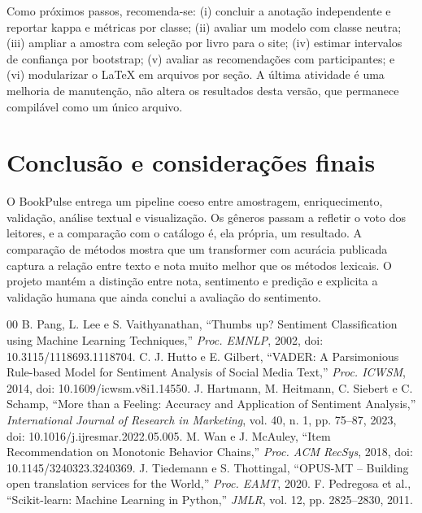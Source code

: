 \documentclass[conference]{IEEEtran}
\begin{document}
Como próximos passos, recomenda-se: (i) concluir a anotação independente e
reportar kappa e métricas por classe; (ii) avaliar um modelo com classe neutra;
(iii) ampliar a amostra com seleção por livro para o site; (iv) estimar
intervalos de confiança por bootstrap; (v) avaliar as recomendações com
participantes; e (vi) modularizar o LaTeX em arquivos por seção. A última
atividade é uma melhoria de manutenção, não altera os resultados desta
versão, que permanece compilável como um único arquivo.

\section{Conclusão e considerações finais}

O BookPulse entrega um pipeline coeso entre amostragem, enriquecimento,
validação, análise textual e visualização. Os gêneros passam a refletir o voto
dos leitores, e a comparação com o catálogo é, ela própria, um resultado. A
comparação de métodos mostra que um transformer com acurácia publicada captura
a relação entre texto e nota muito melhor que os métodos lexicais. O projeto
mantém a distinção entre nota, sentimento e predição e explicita a validação
humana que ainda conclui a avaliação do sentimento.

\begin{thebibliography}{00}
 B. Pang, L. Lee e S. Vaithyanathan, ``Thumbs up? Sentiment
Classification using Machine Learning Techniques,'' \textit{Proc. EMNLP}, 2002,
doi: 10.3115/1118693.1118704.
 C. J. Hutto e E. Gilbert, ``VADER: A Parsimonious
Rule-based Model for Sentiment Analysis of Social Media Text,'' \textit{Proc.
ICWSM}, 2014, doi: 10.1609/icwsm.v8i1.14550.
 J. Hartmann, M. Heitmann, C. Siebert e C. Schamp,
``More than a Feeling: Accuracy and Application of Sentiment Analysis,''
\textit{International Journal of Research in Marketing}, vol. 40, n. 1,
pp. 75--87, 2023, doi: 10.1016/j.ijresmar.2022.05.005.
 M. Wan e J. McAuley, ``Item Recommendation on Monotonic
Behavior Chains,'' \textit{Proc. ACM RecSys}, 2018,
doi: 10.1145/3240323.3240369.
 J. Tiedemann e S. Thottingal, ``OPUS-MT -- Building open
translation services for the World,'' \textit{Proc. EAMT}, 2020.
 F. Pedregosa et al., ``Scikit-learn: Machine Learning in
Python,'' \textit{JMLR}, vol. 12, pp. 2825--2830, 2011.
\end{thebibliography}
\end{document}
